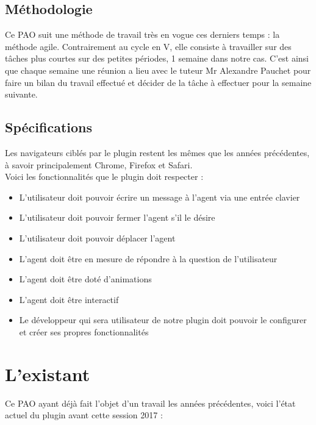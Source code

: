 \documentclass[11pt,dvipsnames,svgnames]{report}
\begin{document}
	\section{Méthodologie}
	
	Ce PAO suit une méthode de travail très en vogue ces derniers temps : la méthode agile. Contrairement au cycle en V, elle consiste à travailler sur des tâches plus courtes sur des petites périodes, 1 semaine dans notre cas. C'est ainsi que chaque semaine une réunion a lieu avec le tuteur Mr Alexandre Pauchet pour faire un bilan du travail effectué et décider de la tâche à effectuer pour la semaine suivante.
	
	\section{Spécifications}
	
	Les navigateurs ciblés par le plugin restent les mêmes que les années précédentes, à savoir principalement Chrome, Firefox et Safari.\\
	
	Voici les fonctionnalités que le plugin doit respecter : \\
	\begin{itemize}
	\item L'utilisateur doit pouvoir écrire un message à l'agent via une entrée clavier
	\item L'utilisateur doit pouvoir fermer l'agent s'il le désire
	\item L'utilisateur doit pouvoir déplacer l'agent
	\item L'agent doit être en mesure de répondre à la question de l'utilisateur
	\item L'agent doit être doté d'animations
	\item L'agent doit être interactif
	\item Le développeur qui sera utilisateur de notre plugin doit pouvoir le configurer et créer ses propres fonctionnalités \\
	
	\end{itemize}
	
\chapter{L'existant}

	Ce PAO ayant déjà fait l'objet d'un travail les années précédentes, voici l'état actuel du plugin avant cette session 2017 :
	
\end{document}

